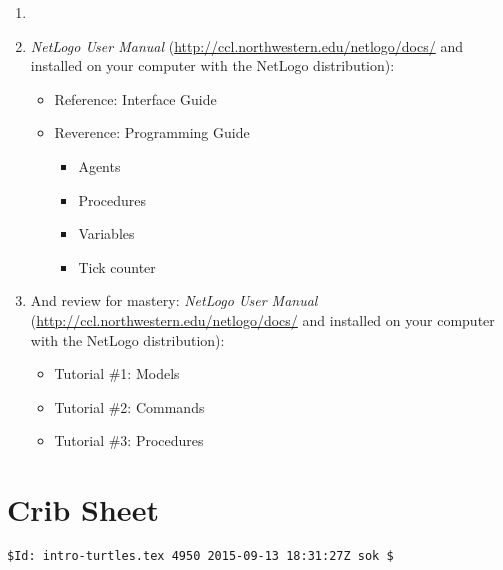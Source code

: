 \begin{enumerate}
\item \citet[chapter 2, pages 68--87]{wilensky_rand_2015}

\item {\it NetLogo User Manual} (\url{http://ccl.northwestern.edu/netlogo/docs/} and installed on
  your computer
  with the NetLogo distribution):
\begin{itemize}
\item Reference: Interface Guide
\item Reverence: Programming Guide
\begin{itemize}
\item     Agents
\item    Procedures
\item    Variables
\item    Tick counter
\end{itemize}
\end{itemize}

\item And review for mastery: {\it NetLogo User Manual} (\url{http://ccl.northwestern.edu/netlogo/docs/} and installed on
  your computer
  with the NetLogo distribution):
\begin{itemize}
\item Tutorial \#1: Models
\item Tutorial \#2: Commands
\item Tutorial \#3: Procedures
\end{itemize}
\end{enumerate}



\setcounter{section}{-1}

\section{Crib Sheet}



\ifnum{}
\vfill
\noindent\verb+$Id: intro-turtles.tex 4950 2015-09-13 18:31:27Z sok $+
\fi